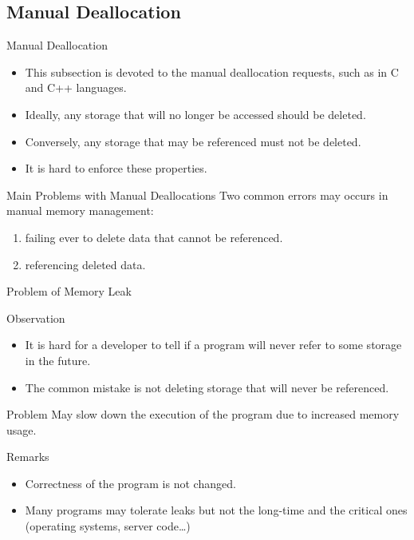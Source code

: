 \begin{bibunit}[apalike]
\subsection{Manual Deallocation}

\tableofcontentslide[sections={1-5},sectionstyle={show/shaded},subsectionstyle={show/shaded/hide},subsubsectionstyle={hide/hide/hide/hide}]

\begin{frame}{Manual Deallocation}
	\begin{itemize}
	\item This subsection is devoted to the manual deallocation requests, such as in C and C++ languages.
	\vfill
	\item Ideally, any storage that will no longer be accessed should be deleted.
	\vfill
	\item Conversely, any storage that may be referenced must not be deleted.
	\vfill
	\item It is hard to enforce these properties.
	\end{itemize}
\end{frame}

\begin{frame}{Main Problems with Manual Deallocations}
	Two common errors may occurs in manual memory management:
	\begin{enumerate}
	\vfill
	\item[Memory Leak] failing ever to delete data that cannot be referenced.
	\vfill
	\item[Dangling-pointer reference] referencing deleted data.
	\end{enumerate}
\end{frame}

\begin{frame}{Problem of Memory Leak}
	\begin{small}
	\begin{block}{\small Observation}
		\begin{itemize}
		\item It is hard for a developer to tell if a program will never refer to some storage in the future.
		\item The common mistake is not deleting storage that will never be referenced.
		\end{itemize}
	\end{block}
	\begin{alertblock}{\small Problem}
		May slow down the execution of the program due to increased memory usage.
	\end{alertblock}
	\begin{block}{\small Remarks}
		\begin{itemize}
		\item Correctness of the program is not changed.
		\item Many programs may tolerate leaks but not the long-time and the critical ones (operating systems, server code\dots)
		\end{itemize}
	\end{block}
	\end{small}
\end{frame}


\end{bibunit}
